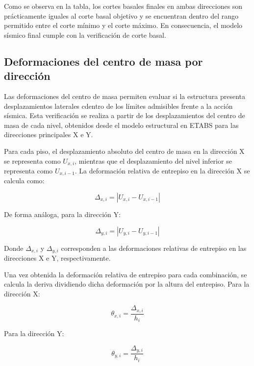Como se observa en la tabla, los cortes basales finales en ambas direcciones son prácticamente iguales al corte basal objetivo y se encuentran dentro del rango permitido entre el corte mínimo y el corte máximo. En consecuencia, el modelo sísmico final cumple con la verificación de corte basal.

\subsection{Deformaciones del centro de masa por dirección}

Las deformaciones del centro de masa permiten evaluar si la estructura presenta desplazamientos laterales cdentro de los límites admisibles frente a la acción sísmica. Esta verificación se realiza a partir de los desplazamientos del centro de masa de cada nivel, obtenidos desde el modelo estructural en ETABS para las direcciones principales X e Y.

Para cada piso, el desplazamiento absoluto del centro de masa en la dirección X se representa como $U_{x,i}$, mientras que el desplazamiento del nivel inferior se representa como $U_{x,i-1}$. La deformación relativa de entrepiso en la dirección X se calcula como:

\begin{equation}
\Delta_{x,i} =
\left| U_{x,i} - U_{x,i-1} \right|
\end{equation}

De forma análoga, para la dirección Y:

\begin{equation}
\Delta_{y,i} =
\left| U_{y,i} - U_{y,i-1} \right|
\end{equation}

Donde $\Delta_{x,i}$ y $\Delta_{y,i}$ corresponden a las deformaciones relativas de entrepiso en las direcciones X e Y, respectivamente. 

Una vez obtenida la deformación relativa de entrepiso para cada combinación, se calcula la deriva dividiendo dicha deformación por la altura del entrepiso. Para la dirección X:

\begin{equation}
\theta_{x,i} =
\frac{\Delta_{x,i}}{h_i}
\end{equation}

Para la dirección Y:

\begin{equation}
\theta_{y,i} =
\frac{\Delta_{y,i}}{h_i}
\end{equation}

